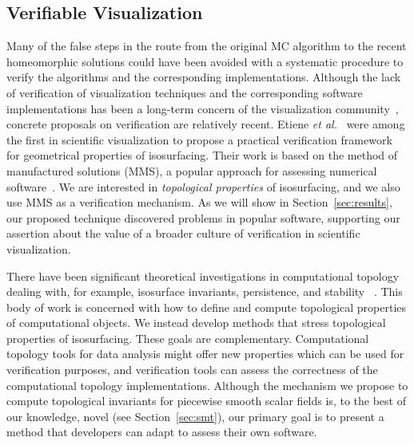 \subsection{Verifiable Visualization}
Many of the false steps in the route from the
original MC algorithm to the recent homeomorphic solutions
could have been avoided with a systematic procedure to verify the
algorithms and the corresponding implementations. 
%
Although the lack of verification of visualization techniques and the
corresponding software implementations has been a long-term concern of
the visualization community~\cite{globus95,kirby-vv-08}, concrete
proposals on verification are relatively recent.
%
Etiene \emph{et al.}~\cite{etiene:tvcg:2009} were among the first
in scientific visualization to propose a practical
verification framework for geometrical properties of isosurfacing.
Their work is
based on the method of manufactured solutions (MMS),
a popular approach for assessing numerical software~\cite{babuska04}. 
We are interested in \emph{topological properties} of
isosurfacing, and we also use MMS as a
verification mechanism. As we will show in Section~\ref{sec:results}, our proposed
technique discovered problems in popular software,
supporting our assertion about the value of a
broader culture of verification in scientific visualization.

There have been significant theoretical investigations in computational
topology dealing with, for example, isosurface invariants, persistence, and stability~
\cite{Cohen-Steiner07, edelsbrunner10}.
%
This body of work is concerned with how to
define and compute topological properties of computational objects. 
%
We instead develop methods that stress topological properties of isosurfacing.
%
These goals are complementary.
%
Computational topology 
tools for data analysis might offer new properties which can be used
for verification purposes, and verification tools can
assess the correctness of the computational topology implementations.
%
Although the mechanism we propose to compute topological invariants
for piecewise smooth scalar fields is, to the best of our knowledge,
novel (see Section~\ref{sec:smt}), our primary goal is to present a
method that developers can adapt to assess their own software.


